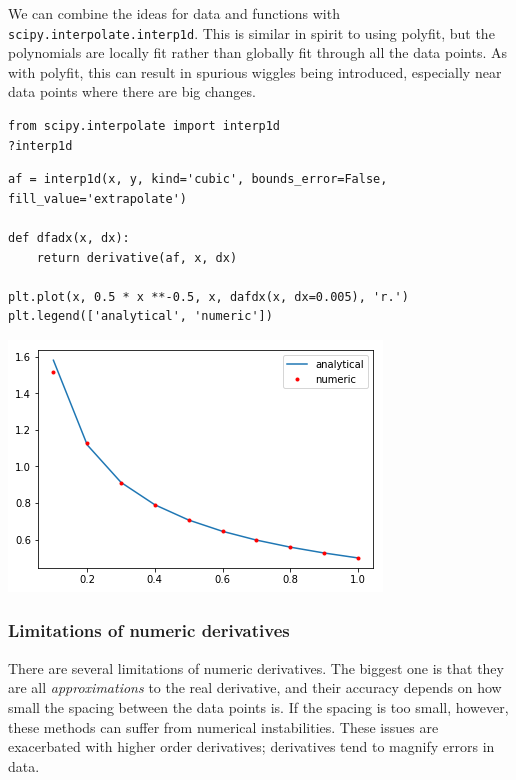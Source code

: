 \documentclass[11pt]{article}
\begin{document}
We can combine the ideas for data and functions with \texttt{scipy.interpolate.interp1d}. This is similar in spirit to using polyfit, but the polynomials are locally fit rather than globally fit through all the data points. As with polyfit, this can result in spurious wiggles being introduced, especially near data points where there are big changes.

\begin{verbatim}
from scipy.interpolate import interp1d
?interp1d
\end{verbatim}

\begin{verbatim}
af = interp1d(x, y, kind='cubic', bounds_error=False, fill_value='extrapolate')

def dfadx(x, dx):
    return derivative(af, x, dx)

plt.plot(x, 0.5 * x **-0.5, x, dafdx(x, dx=0.005), 'r.')
plt.legend(['analytical', 'numeric'])
\end{verbatim}

\begin{center}
\includegraphics[width=.9\linewidth]{obipy-resources/7b778712de6ec6a237e88377d645bb2e-78386Qdg.png}
\end{center}

\subsubsection{Limitations of numeric derivatives}
\label{sec:org217d7cc}

There are several limitations of numeric derivatives. The biggest one is that they are all \emph{approximations} to the real derivative, and their accuracy depends on how small the spacing between the data points is. If the spacing is too small, however, these methods can suffer from numerical instabilities. These issues are exacerbated with higher order derivatives; derivatives tend to magnify errors in data.
\end{document}
